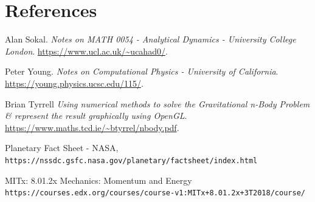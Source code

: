 \documentclass[12pt]{article}
\begin{document}
\section{References}
\begin{thebibliography}{9}
Alan Sokal.
\textit{Notes on MATH 0054 - Analytical Dynamics - University College London}.
\url{https://www.ucl.ac.uk/~ucahad0/}.

Peter Young.
\textit{Notes on Computational Physics - University of California}.
\url{https://young.physics.ucsc.edu/115/}.

Brian Tyrrell
\textit{Using numerical methods to solve the Gravitational n-Body Problem & represent the result graphically using OpenGL}.
\url{https://www.maths.tcd.ie/~btyrrel/nbody.pdf}.

Planetary Fact Sheet - NASA,
\\\texttt{https://nssdc.gsfc.nasa.gov/planetary/factsheet/index.html}

MITx: 8.01.2x Mechanics: Momentum and Energy
\\\texttt{https://courses.edx.org/courses/course-v1:MITx+8.01.2x+3T2018/course/}
\end{thebibliography}
\end{document}
